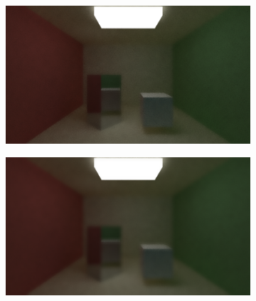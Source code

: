 \documentclass[titlepage,12pt]{report}
\begin{document}
\begin{figure}[H]
	\centering
	\begin{subfigure}{.48\textwidth}
		\centering
		\includegraphics[scale=0.2]{media/bilateral/cornell_normal_50_bilateral_filter_21_15_10.png}
		\label{bilateral_filter_21}
	\end{subfigure}
	\begin{subfigure}{.48\textwidth}
		\centering
		\includegraphics[scale=0.2]{media/bilateral/cornell_normal_50_bilateral_filter_21_15_20.png}
		\label{bilateral_filter_22}
	\end{subfigure}


\end{figure}
\end{document}
